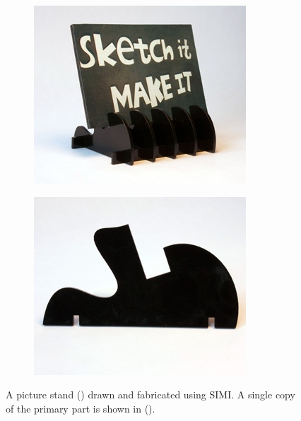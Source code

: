 \begin{figure}
  \centering
  \begin{subfigure}[b]{0.45\textwidth}
    \centering
    \includegraphics[width=\textwidth]{img/simi-stand-withpic.jpg}
    \caption{} %
    \label{fig:example-1}
  \end{subfigure}
  \begin{subfigure}[b]{0.45\textwidth}
    \centering
    \includegraphics[width=\textwidth]{img/simi-stand-part.jpg}
    \caption{} %
    \label{fig:example-2}
  \end{subfigure}
  \caption[Picture Frame Stand]{A picture stand ()
    drawn and fabricated using SIMI. A single copy of the primary part
    is shown in (). }
  \label{fig:simi-example}
\end{figure}
